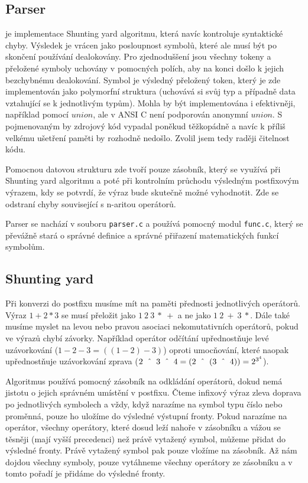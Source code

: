 \documentclass[11pt]{article}
\newcommand\CARET{\mathbin{\char`\^}}
\begin{document}
\subsection{Parser}
je implementace Shunting yard algoritmu, která navíc kontroluje syntaktické
chyby. Výsledek je vrácen jako posloupnost symbolů, které ale musí být po
skončení používání dealokovány. Pro zjednoduššení jsou všechny tokeny a
přeložené symboly uchovány v pomocných polích, aby na konci došlo k jejich
bezchybnému dealokování. Symbol je výsledný přeložený token, který je zde
implementován jako polymorfní struktura (uchovává si svůj typ a případně data
vztahující se k jednotlivým typům). Mohla by být implementována i efektivněji,
například pomocí $union$, ale v ANSI C není podporován anonymní $union$. S
pojmenovaným by zdrojový kód vypadal poněkud těžkopádně a navíc k příliš
velkému ušetření paměti by rozhodně nedošlo. Zvolil jsem tedy raději čitelnost
kódu. 

Pomocnou datovou strukturu zde tvoří pouze zásobník, který se využívá při
Shunting yard algoritmu a poté při kontrolním průchodu výsledným postfixovým
výrazem, kdy se potvrdí, že výraz bude skutečně možné vyhodnotit. Zde se
odstraní chyby související s n-aritou operátorů.

Parser se nachází v souboru \texttt{parser.c} a používá pomocný modul
\texttt{func.c}, který se převážně stará o správné definice a správné přiřazení
matematických funkcí symbolům.

\subsection{Shunting yard}
Při konverzi do postfixu musíme mít na paměti přednosti jednotlivých operátorů.
Výraz $1 + 2 * 3$ se musí přeložit jako $1~2~3~*~+$ a ne jako $1~2~+~3~*$.
Dále také musíme myslet na levou nebo pravou asociaci nekomutativních
operátorů, pokud ve výrazů chybí závorky.  Například operátor odčítání
upřednostňuje levé uzávorkování ($1
- 2 - 3 = ((1 - 2) - 3)$) oproti umocňování, které naopak upřednostňuje
  uzávorkování zprava ($2~\CARET~3~\CARET~4 = (2~\CARET~(3~\CARET~4)) =
2^{3^4}$).

Algoritmus používá pomocný zásobník na odkládání operátorů, dokud nemá jistotu
o jejich správném umístění v postfixu. Čteme infixový výraz zleva doprava po
jednotlivých symbolech a vždy, když narazíme na symbol typu číslo nebo proměnná,
pouze ho uložíme do výsledné výstupní fronty. Pokud narazíme na operátor,
všechny operátory, které dosud leží nahoře v zásobníku a vážou se těsněji (mají
vyšší precedenci) než právě vytažený symbol, můžeme přidat do výsledné fronty.
Právě vytažený symbol pak pouze vložíme na zásobník. Až nám dojdou všechny
symboly, pouze vytáhneme všechny operátory ze zásobníku a v tomto pořadí je
přidáme do výsledné fronty. \\
\end{document}
